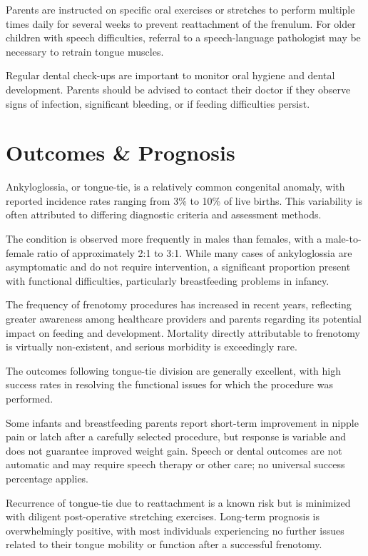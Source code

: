 Parents are instructed on specific oral exercises or stretches to perform multiple times daily for several weeks to prevent reattachment of the frenulum. For older children with speech difficulties, referral to a speech-language pathologist may be necessary to retrain tongue muscles. 

Regular dental check-ups are important to monitor oral hygiene and dental development. Parents should be advised to contact their doctor if they observe signs of infection, significant bleeding, or if feeding difficulties persist.

\section*{Outcomes \& Prognosis}
Ankyloglossia, or tongue-tie, is a relatively common congenital anomaly, with reported incidence rates ranging from 3\% to 10\% of live births. This variability is often attributed to differing diagnostic criteria and assessment methods. 

The condition is observed more frequently in males than females, with a male-to-female ratio of approximately 2:1 to 3:1. While many cases of ankyloglossia are asymptomatic and do not require intervention, a significant proportion present with functional difficulties, particularly breastfeeding problems in infancy. 

The frequency of frenotomy procedures has increased in recent years, reflecting greater awareness among healthcare providers and parents regarding its potential impact on feeding and development. Mortality directly attributable to frenotomy is virtually non-existent, and serious morbidity is exceedingly rare.

The outcomes following tongue-tie division are generally excellent, with high success rates in resolving the functional issues for which the procedure was performed. 

Some infants and breastfeeding parents report short-term improvement in nipple pain or latch after a carefully selected procedure, but response is variable and does not guarantee improved weight gain. Speech or dental outcomes are not automatic and may require speech therapy or other care; no universal success percentage applies.

Recurrence of tongue-tie due to reattachment is a known risk but is minimized with diligent post-operative stretching exercises. Long-term prognosis is overwhelmingly positive, with most individuals experiencing no further issues related to their tongue mobility or function after a successful frenotomy.

